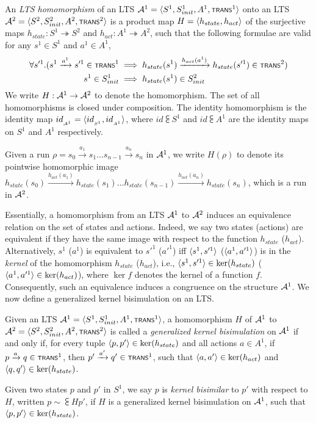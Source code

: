 \begin{definition}
	An \emph{LTS homomorphism} of an LTS $\cal A^1 = \tup{S^1,S^1_{init},A^1,\trans^1}$ onto an LTS $\cal A^2 = \tup{S^2,S_{init}^2,A^2,\trans^2}$ is a product map $H = \tup{h_{state},h_{act}}$ of the surjective maps $h_{state} : S^1 \twoheadrightarrow S^2$ and $h_{act} : A^1 \twoheadrightarrow A^2$, such that the following formulae are valid for any $s^1\in S^1$ and $a^1 \in A^1$,
	\begin{align*}
		\forall s'^1.(s^1 \xrightarrow{a^1} s'^1 \in \trans^1 & \implies h_{state}(s^1) \xrightarrow{h_{act}(a^1)} h_{state}(s'^1) \in \trans^2) \\
		s^1 \in S_{init}^1 & \implies h_{state}(s^1) \in S_{init}^2
	\end{align*}
	We write $H : \cal A^1 \rightarrow \cal A^2$ to denote the homomorphism. The set of all homomorphisms is closed under composition. The identity homomorphism is the identity map $id\subsub{\cal A^1} = \tup{id\subsub{S^1},id\subsub{A^1}}$, where $id\subsub{S^1}$ and $id\subsub{A^1}$ are the identity maps on $S^1$ and $A^1$ respectively.
	
	 Given a run $\rho = s_0 \xrightarrow{a_1} s_1 \ldots s_{n-1} \xrightarrow{a_n} s_n$ in $\cal A^1$, we write $H(\rho)$ to denote its pointwise homomorphic image $h_{state}(s_0) \xrightarrow{h_{act}(a_1)} h_{state}(s_1) \ldots h_{state}(s_{n-1}) \xrightarrow{h_{act}(a_n)} h_{state}(s_n)$, which is a run in $\cal A^2$.
\end{definition}

Essentially, a homomorphism from an LTS $\cal A^1$ to $\cal A^2$ induces an equivalence relation on the set of states and actions. Indeed, we say two states (actions) are equivalent if they have the same image with respect to the function $h_{state}$ ($h_{act}$). Alternatively, $s^1$ ($a^1$) is equivalent to $s'^1$ ($a'^1$) iff $\tup{s^1,s'^1}$ ($\tup{a^1,a'^1}$) is in the \emph{kernel} of the homomorphism $h_{state}$ ($h_{act}$), i.e., $\tup{s^1,s'^1}\in \ker{h_{state}}$ ($\tup{a^1,a'^1}\in \ker{h_{act}}$), where $\ker{f}$ denotes the kernel of a function $f$. Consequently, such an equivalence induces a congruence on the structure $\cal A^1$. We now define a generalized kernel bisimulation on an LTS.

\begin{definition}\label{def:kernel-bisim}
	Given an LTS $\cal A^1 = \tup{S^1,S^1_{init},A^1,\trans^1}$, a homomorphism $H$ of $\cal A^1$ to $\cal A^2 = \tup{S^2,S_{init}^2,A^2,\trans^2}$ is called a \emph{generalized kernel bisimulation} on $\cal A^1$ if and only if, for every tuple $\tup{p,p'}\in\ker{h_{state}}$ and all actions $a \in A^1$, if $p \xrightarrow{a} q \in \trans^1$, then $p' \xrightarrow{a'} q' \in \trans^1$, such that $\tup{a,a'}\in \ker{h_{act}}$ and $\tup{q,q'}\in \ker{h_{state}}$.
	
	Given two states $p$ and $p'$ in $S^1$, we say $p$ is \emph{kernel bisimilar} to $p'$ with respect to $H$, written $p \sim\subsub{H} p'$, if $H$ is a generalized kernel bisimulation on $\cal A^1$, such that $\tup{p,p'}\in\ker{h_{state}}$.
\end{definition}

